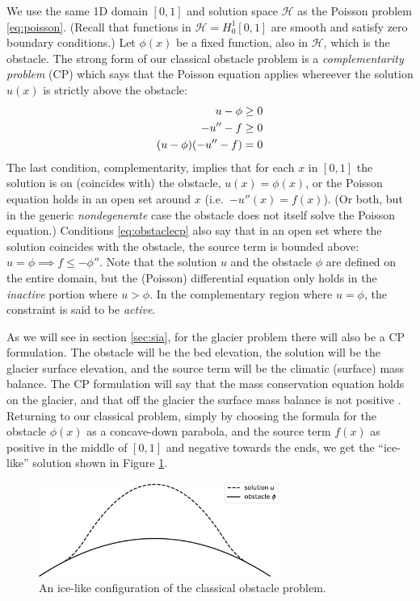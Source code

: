 \documentclass[letterpaper,final,12pt,reqno]{amsart}
\begin{document}
We use the same 1D domain $[0,1]$ and solution space $\mathcal{H}$ as the Poisson problem \eqref{eq:poisson}.  (Recall that functions in $\mathcal{H}=H_0^1[0,1]$ are smooth and satisfy zero boundary conditions.)  Let $\phi(x)$ be a fixed function, also in $\mathcal{H}$, which is the obstacle.  The strong form of our classical obstacle problem is a \emph{complementarity problem} (CP) \cite{Bueler2021,KinderlehrerStampacchia1980} which says that the Poisson equation applies whereever the solution $u(x)$ is strictly above the obstacle:
\begin{align}
  u - \phi &\ge 0 \label{eq:obstaclecp} \\
  -u''-f &\ge 0 \notag \\
  (u-\phi)(-u''-f) &= 0 \notag
\end{align}
The last condition, complementarity, implies that for each $x$ in $[0,1]$ the solution is on (coincides with) the obstacle, $u(x)=\phi(x)$, or the Poisson equation holds in an open set around $x$ (i.e.~$-u''(x)=f(x)$).  (Or both, but in the generic \emph{nondegenerate} \cite{KinderlehrerStampacchia1980} case the obstacle does not itself solve the Poisson equation.)  Conditions \eqref{eq:obstaclecp} also say that in an open set where the solution coincides with the obstacle, the source term is bounded above: $u=\phi \implies f \le -\phi''$.  Note that the solution $u$ and the obstacle $\phi$ are defined on the entire domain, but the (Poisson) differential equation only holds in the \emph{inactive} portion where $u>\phi$.  In the complementary region where $u=\phi$, the constraint is said to be \emph{active}.

As we will see in section \ref{sec:sia}, for the glacier problem there will also be a CP formulation.  The obstacle will be the bed elevation, the solution will be the glacier surface elevation, and the source term will be the climatic (surface) mass balance.  The CP formulation will say that the mass conservation equation holds on the glacier, and that off the glacier the surface mass balance is not positive \cite{Bueler2016}.  Returning to our classical problem, simply by choosing the formula for the obstacle $\phi(x)$ as a concave-down parabola, and the source term $f(x)$ as positive in the middle of $[0,1]$ and negative towards the ends, we get the ``ice-like'' solution shown in Figure \ref{fig:icelike}.

\begin{figure}
\includegraphics[width=0.7\textwidth]{fixfigs/icelike.pdf}
\caption{An ice-like configuration of the classical obstacle problem.}
\label{fig:icelike}
\end{figure}
\end{document}
